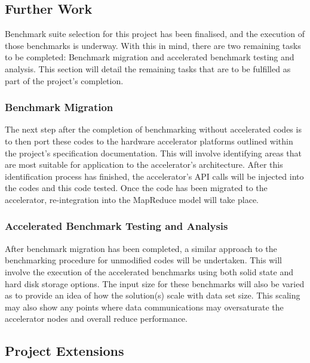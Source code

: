 \documentclass[12pt,a4paper]{article}
\begin{document}
        \subsection{Further Work}
        \label{sub:further_work}

            Benchmark suite selection for this project has been finalised, and the execution of those benchmarks is underway. With this in mind, there are two remaining tasks to be completed: Benchmark migration and accelerated benchmark testing and analysis. This section will detail the remaining tasks that are to be fulfilled as part of the project's completion.

                \subsubsection{Benchmark Migration}
                \label{sub:benchmark_migration}

                    The next step after the completion of benchmarking without accelerated codes is to then port these codes to the hardware accelerator platforms outlined within the project's specification documentation. This will involve identifying areas that are most suitable for application to the accelerator's architecture. After this identification process has finished, the accelerator's API calls will be injected into the codes and this code tested. Once the code has been migrated to the accelerator, re-integration into the MapReduce model will take place.

                \subsubsection{Accelerated Benchmark Testing and Analysis}
                \label{sub:accelerated_benchmark_testing_and_analysis}

                    After benchmark migration has been completed, a similar approach to the benchmarking procedure for unmodified codes will be undertaken. This will involve the execution of the accelerated benchmarks using both solid state and hard disk storage options. The input size for these benchmarks will also be varied as to provide an idea of how the solution(s) scale with data set size. This scaling may also show any points where data communications may oversaturate the accelerator nodes and overall reduce performance.
        
        \subsection{Project Extensions}
        \label{sub:project_extensions}
\end{document}
